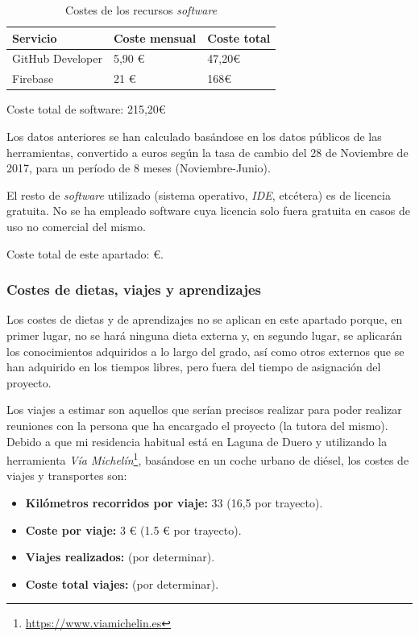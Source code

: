 \documentclass[twoside]{report}
\begin{document}
\begin{table}[H]
\centering
\begin{tabular}{|l|l|l|}
\hline
Servicio         & Coste mensual & Coste total \\ \hline
GitHub Developer & 5,90 \euro        & 47,20\euro          \\ \hline
Firebase         & 21 \euro      & 168\euro           \\ \hline
\end{tabular}
\caption{Costes de los recursos \textit{software}}
\end{table}

Coste total de software: 215,20\euro

Los datos anteriores se han calculado basándose en los datos públicos de las herramientas, convertido a euros según la tasa de cambio del 28 de Noviembre de 2017, para un período de 8 meses (Noviembre-Junio).

El resto de \textit{software} utilizado (sistema operativo, \textit{IDE}, etcétera) es de licencia gratuita. No se ha empleado software cuya licencia solo fuera gratuita en casos de uso no comercial del mismo.

Coste total de este apartado: \euro .

\subsubsection{Costes de dietas, viajes y aprendizajes}

Los costes de dietas y de aprendizajes no se aplican en este apartado porque, en primer lugar, no se hará ninguna dieta externa y, en segundo lugar, se aplicarán los conocimientos adquiridos a lo largo del grado, así como otros externos que se han adquirido en los tiempos libres, pero fuera del tiempo de asignación del proyecto.

Los viajes a estimar son aquellos que serían precisos realizar para poder realizar reuniones con la persona que ha encargado el proyecto (la tutora del mismo). Debido a que mi residencia habitual está en Laguna de Duero y utilizando la herramienta \textit{Vía Michelín}\footnote{\url{https://www.viamichelin.es}}, basándose en un coche urbano de diésel, los costes de viajes y transportes son:

\begin{itemize}
\item \textbf{Kilómetros recorridos por viaje:} 33 (16,5 por trayecto).
\item \textbf{Coste por viaje:} 3 \euro \hspace{0.1cm} (1.5 \euro \hspace{0.1cm} por trayecto).
\item \textbf{Viajes realizados:} (por determinar).
\item \textbf{Coste total viajes:} (por determinar).
\end{itemize}
\end{document}
